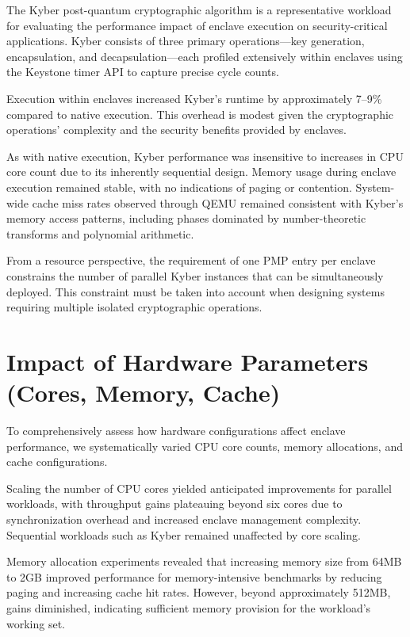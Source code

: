 The Kyber post-quantum cryptographic algorithm is a representative workload for evaluating the performance impact of enclave execution on security-critical applications. Kyber consists of three primary operations—key generation, encapsulation, and decapsulation—each profiled extensively within enclaves using the Keystone timer API to capture precise cycle counts.

Execution within enclaves increased Kyber’s runtime by approximately 7–9\% compared to native execution. This overhead is modest given the cryptographic operations’ complexity and the security benefits provided by enclaves.

As with native execution, Kyber performance was insensitive to increases in CPU core count due to its inherently sequential design. Memory usage during enclave execution remained stable, with no indications of paging or contention. System-wide cache miss rates observed through QEMU remained consistent with Kyber’s memory access patterns, including phases dominated by number-theoretic transforms and polynomial arithmetic.

From a resource perspective, the requirement of one PMP entry per enclave constrains the number of parallel Kyber instances that can be simultaneously deployed. This constraint must be taken into account when designing systems requiring multiple isolated cryptographic operations.

\section{Impact of Hardware Parameters (Cores, Memory, Cache)}

To comprehensively assess how hardware configurations affect enclave performance, we systematically varied CPU core counts, memory allocations, and cache configurations.

Scaling the number of CPU cores yielded anticipated improvements for parallel workloads, with throughput gains plateauing beyond six cores due to synchronization overhead and increased enclave management complexity. Sequential workloads such as Kyber remained unaffected by core scaling.

Memory allocation experiments revealed that increasing memory size from 64MB to 2GB improved performance for memory-intensive benchmarks by reducing paging and increasing cache hit rates. However, beyond approximately 512MB, gains diminished, indicating sufficient memory provision for the workload’s working set.


